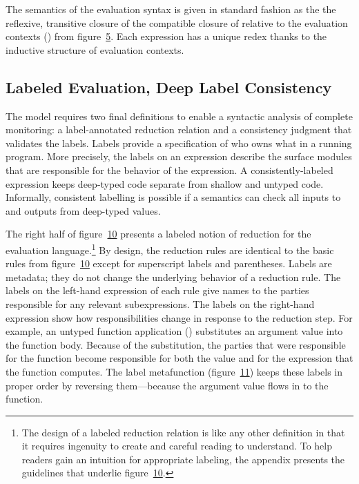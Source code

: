 \documentclass[screen=true, natbib=false, 10pt, sigplan]{acmart}
\let\SOriginalthesubsubsection\thesubsubsection
\newcommand{\Ssubsection}[2]{\subsection[#1]{#2}\let\thesubsubsection\SOriginalthesubsubsection}
\newcommand{\FigureRef}[2]{#1}
\newcommand{\NoteBox}[1]{\footnote{#1}}
\newcommand{\NoteContent}[1]{#1}
\begin{document}
The semantics of the evaluation syntax is given in standard
fashion as the the reflexive,
transitive closure of the compatible closure of \relax{$\snr$} relative to the
evaluation contexts (\relax{$\sctx$}) from figure~\hyperref[t:x28counter_x28x22figurex22_x22figx3amodelx3aevalx2dsyntaxx22x29x29]{\FigureRef{5}{t:x28counter_x28x22figurex22_x22figx3amodelx3aevalx2dsyntaxx22x29x29}}.
Each expression has a unique redex thanks to the inductive structure of
evaluation contexts.

\Ssubsection{Labeled Evaluation, Deep Label Consistency}{Labeled Evaluation, Deep Label Consistency}\label{t:x28part_x22secx3amodelx3amodelx3aownershipx22x29}

The model requires two final definitions to enable a syntactic analysis of
complete monitoring: a label{-}annotated reduction relation and a
consistency judgment that validates the labels.
Labels provide a specification of who owns what in a running program.
More precisely, the labels on an expression describe the surface
modules that are responsible for the behavior of the expression.
A consistently{-}labeled expression keeps deep{-}typed code separate
from shallow and untyped code.
Informally, consistent labelling is possible if a semantics can check
all inputs to and outputs from deep{-}typed values.

The right half of figure~\hyperref[t:x28counter_x28x22figurex22_x22figx3amodelx3arrx22x29x29]{\FigureRef{10}{t:x28counter_x28x22figurex22_x22figx3amodelx3arrx22x29x29}} presents a labeled notion of
reduction for the evaluation language.\NoteBox{\NoteContent{The design of a labeled reduction relation is like any other
definition in that it requires ingenuity to create and careful reading
to understand.
To help readers gain an intuition for appropriate labeling, the appendix
presents the guidelines that underlie figure~\hyperref[t:x28counter_x28x22figurex22_x22figx3amodelx3arrx22x29x29]{\FigureRef{10}{t:x28counter_x28x22figurex22_x22figx3amodelx3arrx22x29x29}}.}}
By design, the reduction rules are identical to the basic rules from
figure~\hyperref[t:x28counter_x28x22figurex22_x22figx3amodelx3arrx22x29x29]{\FigureRef{10}{t:x28counter_x28x22figurex22_x22figx3amodelx3arrx22x29x29}} except for superscript labels and parentheses.
Labels are metadata; they do not change the underlying behavior of a reduction rule.
The labels on the left{-}hand expression of each rule give names to the
parties responsible for any relevant subexpressions.
The labels on the right{-}hand expression show how responsibilities change
in response to the reduction step.
For example, an untyped function application ()
substitutes an argument value into the function body.
Because of the substitution, the parties that were responsible for the
function become responsible for both the value and for the expression that
the function computes.
The label metafunction \relax{$\srev$} (figure~\hyperref[t:x28counter_x28x22figurex22_x22figx3amodelx3aextrax2drrx22x29x29]{\FigureRef{11}{t:x28counter_x28x22figurex22_x22figx3amodelx3aextrax2drrx22x29x29}}) keeps these
labels in proper order by reversing them{---}because the argument value flows in
to the function.
\end{document}
